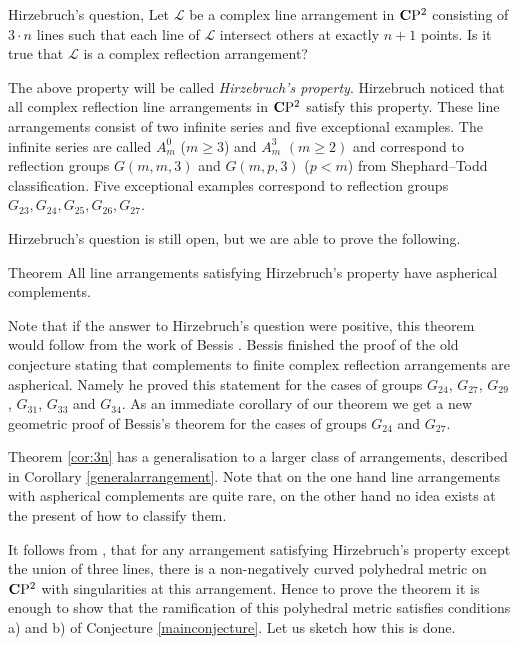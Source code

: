 \documentclass{compositio}
\begin{document}
\begin{thm}{Hirzebruch's question, \cite{Hirzebruch}} Let  $\mathcal{L}$ be a complex line arrangement in $\mathbf{C}\mathrm{P}^2$ consisting of $3\cdot n$ lines such that each line of $\mathcal{L}$ intersect others at exactly $n+1$ points. 
Is it true that $\mathcal{L}$ is a complex reflection arrangement?
\end{thm}
The above property will be called {\it Hirzebruch's property}.
Hirzebruch noticed that all complex reflection line arrangements in $\mathbf{C}\mathrm{P}^2$ satisfy this property. These line arrangements consist of two infinite series and five exceptional examples. 
The infinite series are called $A_m^0$ ($m\ge 3$) and $A_m^3$ $(m\ge 2)$ and correspond to reflection groups $G(m,m,3)$ and $G(m,p,3)$ ($p<m$) from Shephard--Todd classification. 
Five  exceptional examples correspond to reflection groups $G_{23}, G_{24}, G_{25}, G_{26}, G_{27}$. 

Hirzebruch's question is still open, but we are able to prove the following.

\begin{thm}{Theorem}\label{cor:3n}
All line arrangements satisfying Hirzebruch's property have aspherical complements.
\end{thm}

Note that if the answer to Hirzebruch's question were positive, this theorem would follow from 
the work of Bessis \cite{bessis}. 
Bessis finished the proof of the old conjecture stating that complements to finite complex reflection arrangements are aspherical. 
Namely he proved this statement for the cases of groups  $G_{24}$, $G_{27}$, $G_{29}$, $G_{31}$, $G_{33}$ and $G_{34}$. 
As an immediate corollary of our theorem we get a new geometric proof of Bessis's theorem for the cases of groups  $G_{24}$ and $G_{27}$.

Theorem \ref{cor:3n} has a generalisation to a larger class of arrangements, described in Corollary \ref{generalarrangement}. 
Note that on the one hand line arrangements with aspherical complements are quite rare, on the other hand no idea exists at the present of how to classify them.  


It follows from \cite[Corollary 7.8]{panov},
that for any arrangement satisfying Hirzebruch's property except the union of three lines, there is a non-negatively curved polyhedral metric on $\mathbf{C}\mathrm{P}^2$ with singularities at this arrangement. Hence to prove the theorem it is enough to show that the ramification of this polyhedral metric satisfies conditions a) and b) of Conjecture \ref{mainconjecture}.  Let us sketch how this is done.
\end{document}
